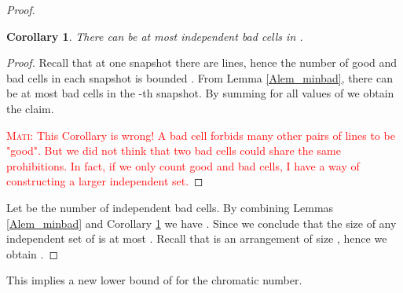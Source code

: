 \documentclass[11pt,a4paper]{article}
\newtheorem{corollary}[theorem]{Corollary}
\newcommand{\mati}[1]{\textcolor{red}{\textsc{Mati:} #1}}
\begin{document}
\begin{proof}
\begin{corollary}\label{Acor_maxbad}
There can be at most  independent bad cells in .
\end{corollary}
\begin{proof}
Recall that at one snapshot there are  lines, hence the number of good and bad cells in each snapshot is bounded . From Lemma \ref{Alem_minbad}, there can be at most  bad cells in the -th snapshot. By summing for all values of  we obtain the claim.

\mati{This Corollary is wrong! A bad cell forbids many other pairs of lines to be "good". But we did not think that two bad cells could share the same prohibitions. In fact, if we only count good and bad cells, I have a way of constructing a larger independent set.}
\end{proof}

Let  be the number of independent bad cells. By combining Lemmas \ref{Alem_minbad} and Corollary \ref{Acor_maxbad} we have  . Since  we conclude that the size of any independent set of  is at most . Recall that  is an arrangement of size , hence we obtain .

\end{proof}

This implies a new lower bound of  for the chromatic number.
\fi
\end{document}
